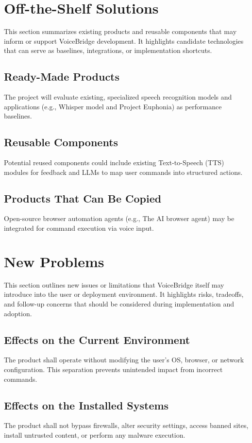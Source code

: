 \documentclass[11pt]{article}
\begin{document}
\section{Off-the-Shelf Solutions}
This section summarizes existing products and reusable components that may inform or support VoiceBridge development. It highlights candidate technologies that can serve as baselines, integrations, or implementation shortcuts.

\subsection{Ready-Made Products}
The project will evaluate existing, specialized speech recognition models and applications (e.g., Whisper model and Project Euphonia) as performance baselines.

\subsection{Reusable Components}
Potential reused components could include existing Text-to-Speech (TTS) modules for feedback and LLMs to map user commands into structured actions.

\subsection{Products That Can Be Copied}
Open-source browser automation agents (e.g., The AI browser agent) may be integrated for command execution via voice input.


\section{New Problems}
This section outlines new issues or limitations that VoiceBridge itself may introduce into the user or deployment environment. It highlights risks, tradeoffs, and follow-up concerns that should be considered during implementation and adoption.

\subsection{Effects on the Current Environment}
The product shall operate without modifying the user’s OS, browser, or network configuration. This separation prevents unintended impact from incorrect commands.

\subsection{Effects on the Installed Systems}
The product shall not bypass firewalls, alter security settings, access banned sites, install untrusted content, or perform any malware execution.
\end{document}
